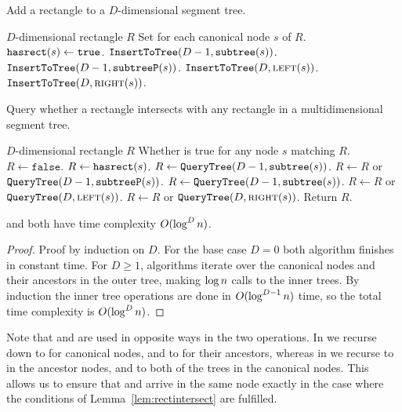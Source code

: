 \documentclass[english,gradu]{tktltiki2018}
\begin{document}
\begin{algorithm}
\caption{Add a rectangle to a $D$-dimensional segment tree.}\label{alg:rectadd}
\begin{algorithmic}
\Require $D$-dimensional rectangle $R$
\Ensure Set  for each canonical node $s$ of $R$.
		\State $\texttt{hasrect}(s)\gets\texttt{true}$.
		\State $\texttt{InsertToTree}(D-1,\texttt{subtree}(s))$.
		\State $\texttt{InsertToTree}(D-1,\texttt{subtreeP}(s))$.
		\State $\texttt{InsertToTree}(D,\textsc{left}(s))$.
		\State $\texttt{InsertToTree}(D,\textsc{right}(s))$.
	\EndIf
\EndProcedure
\end{algorithmic}
\end{algorithm}

\begin{algorithm}
\caption{Query whether a rectangle intersects with any rectangle in a multidimensional segment tree.}\label{alg:rectcheck}
\begin{algorithmic}
\Require $D$-dimensional rectangle $R$
\Ensure Whether  is true for any node $s$ matching $R$.
	\State $R\gets\texttt{false}$.
		\State $R\gets\texttt{hasrect}(s)$.
		\State $R\gets \texttt{QueryTree}(D-1,\texttt{subtree}(s))$.
		\State $R\gets R$ or $\texttt{QueryTree}(D-1,\texttt{subtreeP}(s))$.
		\State $R\gets \texttt{QueryTree}(D-1,\texttt{subtree}(s))$.
		\State $R\gets R$ or $\texttt{QueryTree}(D,\textsc{left}(s))$.
		\State $R\gets R$ or $\texttt{QueryTree}(D,\textsc{right}(s))$.
	\EndIf
	\State Return $R$.
\EndProcedure
\end{algorithmic}
\end{algorithm}

\begin{lem}\adddt and \checkdt both have time complexity $O(\log^Dn)$.\end{lem}
\begin{proof}
Proof by induction on $D$.
For the base case $D=0$ both algorithm finishes in constant time.
For $D\ge 1$, algorithms iterate over the canonical nodes and their ancestors in the outer tree, making $\log n$ calls to the inner trees.
By induction the inner tree operations are done in $O(\log^{D-1}n)$ time, so the total time complexity is $O(\log^Dn)$.
\end{proof}

Note that \subtree{} and \subtreep{} are used in opposite ways in the two operations.
In \adddt{} we recurse down to \subtree{} for canonical nodes, and to \subtreep{} for their ancestors, whereas in \checkdt{} we recurse to \subtree{} in the ancestor nodes, and to both of the trees in the canonical nodes.
This allows us to ensure that \adddt{} and \checkdt{} arrive in the same node exactly in the case where the conditions of Lemma~\ref{lem:rectintersect} are fulfilled.
\end{document}
